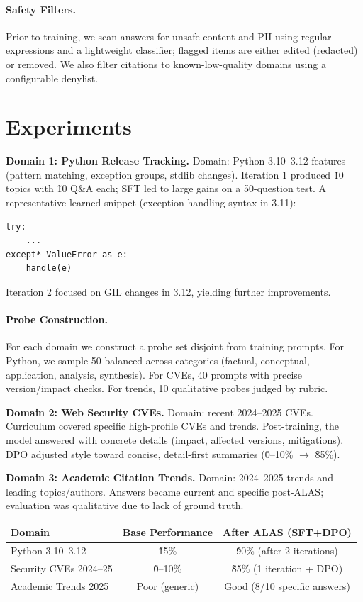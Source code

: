 \documentclass[11pt]{article}
\begin{document}
\paragraph{Safety Filters.} Prior to training, we scan answers for unsafe content and PII using regular expressions and a lightweight classifier; flagged items are either edited (redacted) or removed. We also filter citations to known-low-quality domains using a configurable denylist.

\section{Experiments}
\textbf{Domain 1: Python Release Tracking.} Domain: Python 3.10--3.12 features (pattern matching, exception groups, stdlib changes). Iteration 1 produced \~10 topics with \~10 Q\&A each; SFT led to large gains on a 50-question test. A representative learned snippet (exception handling syntax in 3.11):
\begin{verbatim}
try:
    ...
except* ValueError as e:
    handle(e)
\end{verbatim}
Iteration 2 focused on GIL changes in 3.12, yielding further improvements.

\paragraph{Probe Construction.} For each domain we construct a probe set disjoint from training prompts. For Python, we sample 50 balanced across categories (factual, conceptual, application, analysis, synthesis). For CVEs, 40 prompts with precise version/impact checks. For trends, 10 qualitative probes judged by rubric.

\textbf{Domain 2: Web Security CVEs.} Domain: recent 2024--2025 CVEs. Curriculum covered specific high-profile CVEs and trends. Post-training, the model answered with concrete details (impact, affected versions, mitigations). DPO adjusted style toward concise, detail-first summaries (\~0--10\% \(\to\) \~85\%).

\textbf{Domain 3: Academic Citation Trends.} Domain: 2024--2025 trends and leading topics/authors. Answers became current and specific post-ALAS; evaluation was qualitative due to lack of ground truth.

\begin{center}
\begin{tabular}{lcc}
\hline
Domain & Base Performance & After ALAS (SFT+DPO) \\
\hline
Python 3.10--3.12 & \~15\% & \~90\% (after 2 iterations) \\
Security CVEs 2024--25 & \~0--10\% & \~85\% (1 iteration + DPO) \\
Academic Trends 2025 & Poor (generic) & Good (8/10 specific answers) \\
\hline
\end{tabular}
\end{center}
\end{document}
